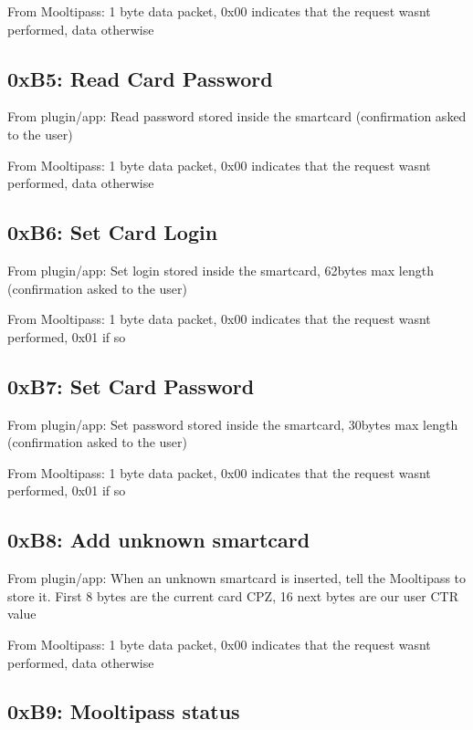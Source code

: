 From Mooltipass\+: 1 byte data packet, 0x00 indicates that the request wasn\textquotesingle{}t performed, data otherwise

\subsection*{0x\+B5\+: Read Card Password }

From plugin/app\+: Read password stored inside the smartcard (confirmation asked to the user)

From Mooltipass\+: 1 byte data packet, 0x00 indicates that the request wasn\textquotesingle{}t performed, data otherwise

\subsection*{0x\+B6\+: Set Card Login }

From plugin/app\+: Set login stored inside the smartcard, 62bytes max length (confirmation asked to the user)

From Mooltipass\+: 1 byte data packet, 0x00 indicates that the request wasn\textquotesingle{}t performed, 0x01 if so

\subsection*{0x\+B7\+: Set Card Password }

From plugin/app\+: Set password stored inside the smartcard, 30bytes max length (confirmation asked to the user)

From Mooltipass\+: 1 byte data packet, 0x00 indicates that the request wasn\textquotesingle{}t performed, 0x01 if so

\subsection*{0x\+B8\+: Add unknown smartcard }

From plugin/app\+: When an unknown smartcard is inserted, tell the Mooltipass to store it. First 8 bytes are the current card C\+PZ, 16 next bytes are our user C\+TR value

From Mooltipass\+: 1 byte data packet, 0x00 indicates that the request wasn\textquotesingle{}t performed, data otherwise

\subsection*{0x\+B9\+: Mooltipass status }

